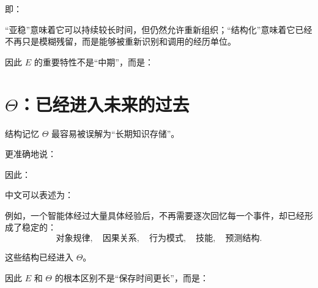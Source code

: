 即：
\begin{statementbox}
\centering
{}
\end{statementbox}

“亚稳”意味着它可以持续较长时间，但仍然允许重新组织；“结构化”意味着它已经不再只是模糊残留，而是能够被重新识别和调用的经历单位。

因此 $E$ 的重要特性不是“中期”，而是：
\begin{statementbox}
\centering
{}
\end{statementbox}

\section{$\Theta$：已经进入未来的过去}

结构记忆 $\Theta$ 最容易被误解为“长期知识存储”。

更准确地说：
\begin{statementbox}
\centering
{}
\end{statementbox}

因此：
\begin{statementbox}
\centering
{}
\end{statementbox}

中文可以表述为：
\begin{statementbox}
\centering
{}
\end{statementbox}

例如，一个智能体经过大量具体经验后，不再需要逐次回忆每一个事件，却已经形成了稳定的：
\[
\text{对象规律},
\quad
\text{因果关系},
\quad
\text{行为模式},
\quad
\text{技能},
\quad
\text{预测结构}.
\]

这些结构已经进入 $\Theta$。

因此 $E$ 和 $\Theta$ 的根本区别不是“保存时间更长”，而是：
\begin{statementbox}
\centering
{}
\end{statementbox}
\begin{statementbox}
\centering
{}
\end{statementbox}

